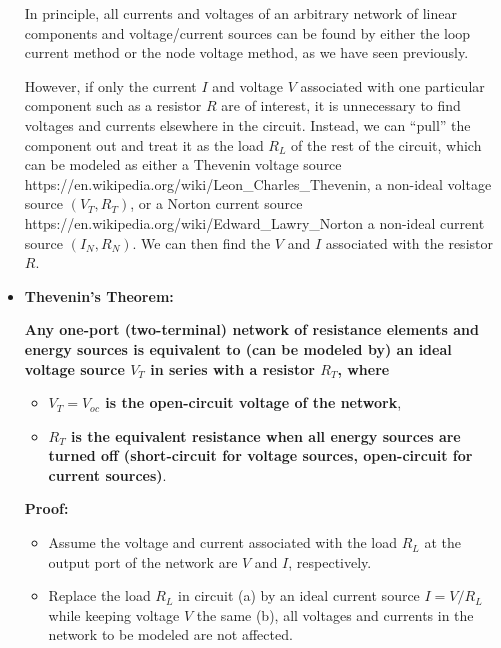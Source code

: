 \documentclass{article}
\begin{document}
\begin{itemize}
In principle, all currents and voltages of an arbitrary network of linear 
components and voltage/current sources can be found by either the loop 
current method or the node voltage method, as we have seen previously.

However, if only the current $I$ and voltage $V$ associated with one 
particular component such as a resistor $R$ are of interest, it is 
unnecessary to find voltages and currents elsewhere in the circuit. 
Instead, we can ``pull'' the component out and treat it as the load 
$R_L$ of the rest of the circuit, which can be modeled as either a 
Thevenin voltage source 
{https://en.wikipedia.org/wiki/Leon_Charles_Thevenin}, a non-ideal 
voltage source $(V_T, R_T)$, or a Norton current source
{https://en.wikipedia.org/wiki/Edward_Lawry_Norton} a non-ideal 
current source $(I_N, R_N)$. We can then find the $V$ and $I$ 
associated with the resistor $R$.


\item {\bf Thevenin's Theorem:}

    {\bf Any one-port (two-terminal) network of resistance elements and energy 
    sources is equivalent to (can be modeled by) an ideal voltage source 
    $V_T$ in series with a resistor $R_T$, where}
  \begin{itemize}
  \item {\bf $V_T=V_{oc}$ is the open-circuit voltage of the network},
  \item {\bf $R_T$ is the equivalent resistance when all energy sources are 
    turned off (short-circuit for voltage sources, open-circuit for current 
    sources)}.
  \end{itemize}

  {\bf Proof:} 

  
  \begin{itemize}
    
  \item Assume the voltage and current associated with the load $R_L$ at
    the output port of the network are $V$ and $I$, respectively. 
    
  \item Replace the load $R_L$ in circuit (a) by an ideal current source 
    $I=V/R_L$ while keeping voltage $V$ the same (b), all voltages and 
    currents in the network to be modeled are not affected. 
	

\end{itemize}
\end{itemize}
\end{document}
